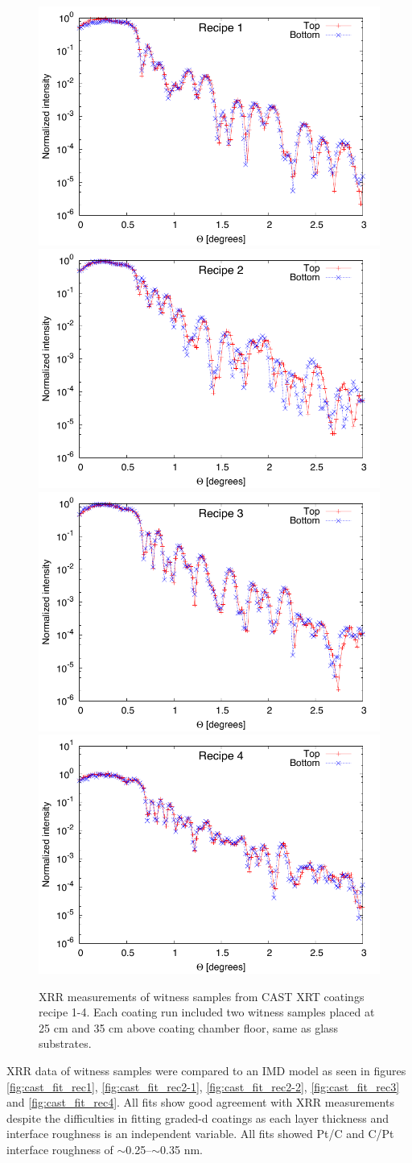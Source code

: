 \begin{figure}[htbp]
  \centering  \includegraphics[width=0.45\linewidth]{figures/cast/cast_recipe1.pdf}  \includegraphics[width=0.45\linewidth]{figures/cast/cast_recipe2.pdf}\\  \includegraphics[width=0.45\linewidth]{figures/cast/cast_recipe3.pdf}  \includegraphics[width=0.45\linewidth]{figures/cast/cast_recipe4.pdf}
  \caption{\footnotesize XRR measurements of witness samples from CAST XRT coatings recipe 1-4. Each coating run included two witness samples placed at 25 cm and 35 cm above coating chamber floor, same as glass substrates.}
  \label{fig:cast_recipe_xrr}
\end{figure}

XRR data of witness samples were compared to an IMD model as seen in figures \ref{fig:cast_fit_rec1}, \ref{fig:cast_fit_rec2-1}, \ref{fig:cast_fit_rec2-2}, \ref{fig:cast_fit_rec3} and \ref{fig:cast_fit_rec4}. All fits show good agreement with XRR measurements despite the difficulties in fitting graded-d coatings as each layer thickness and interface roughness is an independent variable. All fits showed Pt/C and C/Pt interface roughness of $\sim$0.25--$\sim$0.35 nm.

